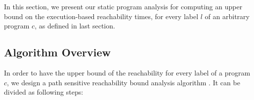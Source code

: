 In this section, we present our static program analysis for computing an upper bound on the 
execution-based reachability times, for every label $l$ of an arbitrary program $c$, as defined in last section.
%
\subsection{Algorithm Overview}
\label{sec:alg_overview}
In order to have the upper bound of the reachability for every label of a program $c$, we design 
a path sensitive reachability bound analysis algorithm {\THESYSTEM}.
It can be divided as following steps: 
%
%
